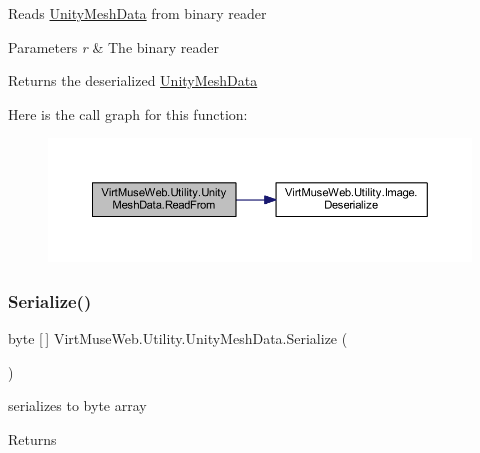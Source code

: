 Reads \mbox{\hyperlink{class_virt_muse_web_1_1_utility_1_1_unity_mesh_data}{Unity\+Mesh\+Data}} from binary reader 


\begin{DoxyParams}{Parameters}
{\em r} & The binary reader\\
\hline
\end{DoxyParams}
\begin{DoxyReturn}{Returns}
the deserialized \mbox{\hyperlink{class_virt_muse_web_1_1_utility_1_1_unity_mesh_data}{Unity\+Mesh\+Data}}
\end{DoxyReturn}
Here is the call graph for this function\+:
\nopagebreak
\begin{figure}[H]
\begin{center}
\leavevmode
\includegraphics[width=350pt]{class_virt_muse_web_1_1_utility_1_1_unity_mesh_data_a85e372f94563bce9ce66a0f930881607_cgraph}
\end{center}
\end{figure}
\mbox{\label{class_virt_muse_web_1_1_utility_1_1_unity_mesh_data_aecb9b3e9ca6cb88d5126e228982b4e06}} 
\subsubsection{\texorpdfstring{Serialize()}{Serialize()}\hspace{0.1cm}{\footnotesize\ttfamily [1/2]}}
{\footnotesize\ttfamily byte \mbox{[}$\,$\mbox{]} Virt\+Muse\+Web.\+Utility.\+Unity\+Mesh\+Data.\+Serialize (\begin{DoxyParamCaption}{ }\end{DoxyParamCaption})}



serializes to byte array 

\begin{DoxyReturn}{Returns}

\end{DoxyReturn}



